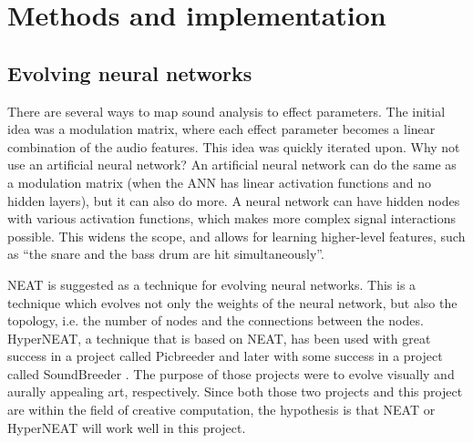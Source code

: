 \chapter{Methods and implementation}
\label{chapter:methods_and_implementation}

\section{Evolving neural networks}
There are several ways to map sound analysis to effect parameters. The initial idea was a modulation matrix, where each effect parameter becomes a linear combination of the audio features. This idea was quickly iterated upon. Why not use an artificial neural network? An artificial neural network can do the same as a modulation matrix (when the ANN has linear activation functions and no hidden layers), but it can also do more. A neural network can have hidden nodes with various activation functions, which makes more complex signal interactions possible. This widens the scope, and allows for learning higher-level features, such as “the snare and the bass drum are hit simultaneously”.

NEAT \citep{stanley2002} is suggested as a technique for evolving neural networks. This is a technique which evolves not only the weights of the neural network, but also the topology, i.e. the number of nodes and the connections between the nodes. HyperNEAT, a technique that is based on NEAT, has been used with great success in a project called Picbreeder \citep{secretan2008} and later with some success in a project called SoundBreeder \citep{ye2014}. The purpose of those projects were to evolve visually and aurally appealing art, respectively. Since both those two projects and this project are within the field of creative computation, the hypothesis is that NEAT or HyperNEAT will work well in this project.


